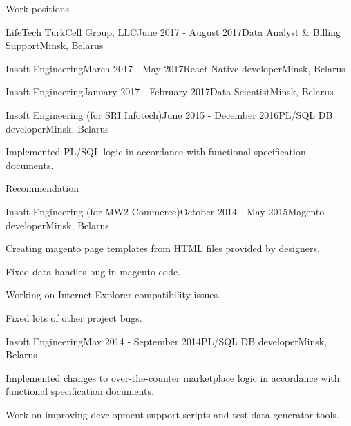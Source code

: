 \documentclass{resume} %
\begin{document}
\begin{rSection}{Work positions}

\begin{rSubsection}{LifeTech TurkCell Group, LLC}{June 2017 - August 2017}{Data Analyst \& Billing Support}{Minsk, Belarus}
\item
\item
\end{rSubsection}

\begin{rSubsection}{Insoft Engineering}{March 2017 - May 2017}{React Native developer}{Minsk, Belarus}
\item
\end{rSubsection}

\begin{rSubsection}{Insoft Engineering}{January 2017 - February 2017}{Data Scientist}{Minsk, Belarus}
\item
\end{rSubsection}

\begin{rSubsection}{Insoft Engineering (for SRI Infotech)}{June 2015 - December 2016}{PL/SQL DB developer}{Minsk, Belarus}
\item Implemented PL/SQL logic in accordance with functional specification documents.
\item \href{https://drive.google.com/file/d/0B256DYrZGsaVZHZJb3FMQ01hVHM/view}{Recommendation}
\end{rSubsection}

\begin{rSubsection}{Insoft Engineering (for MW2 Commerce)}{October 2014 - May 2015}{Magento developer}{Minsk, Belarus}
\item Creating magento page templates from HTML files provided by designers.
\item Fixed data handles bug in magento code.
\item Working on Internet Explorer compatibility issues.
\item Fixed lots of other project bugs.
\end{rSubsection}

\begin{rSubsection}{Insoft Engineering}{May 2014 - September 2014}{PL/SQL DB developer}{Minsk, Belarus}
\item Implemented changes to over-the-counter marketplace logic in accordance with functional specification documents.
\item Work on improving development support scripts and test data generator tools.
\end{rSubsection}

\end{rSection}

\end{document}
